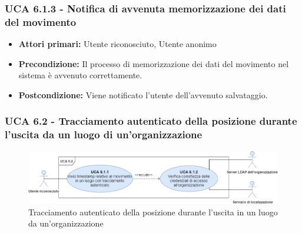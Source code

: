 \subsubsection{UCA 6.1.3 - Notifica di avvenuta memorizzazione dei dati del movimento}
\begin{itemize}
	\item \textbf{Attori primari:} Utente riconosciuto, Utente anonimo
	\item \textbf{Precondizione:} Il processo di memorizzazione dei dati del movimento nel sistema è avvenuto correttamente.
	\item \textbf{Postcondizione:} Viene notificato l'utente dell'avvenuto salvataggio.
\end{itemize}


\subsubsection{UCA 6.2 - Tracciamento autenticato della posizione durante l'uscita da un luogo di un'organizzazione}

\begin{figure}[h]
	\centering
	\includegraphics[scale=0.4, center]{Sezioni/UseCase/Immagini/UCA6.2.png}
	\caption{Tracciamento autenticato della posizione durante l'uscita in un luogo da un'organizzazione}
\end{figure} 

